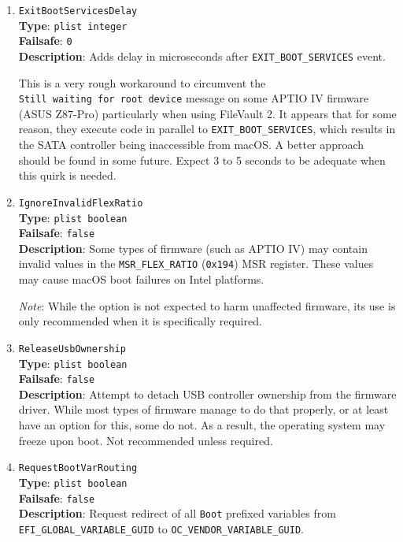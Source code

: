 \documentclass[]{article}
\begin{document}
\begin{enumerate}
\item
  \texttt{ExitBootServicesDelay}\\
  \textbf{Type}: \texttt{plist\ integer}\\
  \textbf{Failsafe}: \texttt{0}\\
  \textbf{Description}: Adds delay in microseconds after \texttt{EXIT\_BOOT\_SERVICES}
  event.

  This is a very rough workaround to circumvent the \texttt{Still\ waiting\ for\ root\ device} message
  on some APTIO IV firmware (ASUS Z87-Pro) particularly when using FileVault 2.
  It appears that for some reason, they execute code in parallel to \texttt{EXIT\_BOOT\_SERVICES},
  which results in the SATA controller being inaccessible from macOS. A better approach should be
  found in some future. Expect 3 to 5 seconds to be adequate when this quirk is needed.

\item
  \texttt{IgnoreInvalidFlexRatio}\\
  \textbf{Type}: \texttt{plist\ boolean}\\
  \textbf{Failsafe}: \texttt{false}\\
  \textbf{Description}: Some types of firmware (such as APTIO IV) may contain invalid values in the
  \texttt{MSR\_FLEX\_RATIO} (\texttt{0x194}) MSR register. These values may cause
  macOS boot failures on Intel platforms.

  \emph{Note}: While the option is not expected to harm unaffected firmware,
  its use is only recommended when it is specifically required.

\item
  \texttt{ReleaseUsbOwnership}\\
  \textbf{Type}: \texttt{plist\ boolean}\\
  \textbf{Failsafe}: \texttt{false}\\
  \textbf{Description}: Attempt to detach USB controller ownership from
  the firmware driver. While most types of firmware manage to do that properly,
  or at least have an option for this, some do not. As a result,
  the operating system may freeze upon boot. Not recommended unless required.

\item
  \texttt{RequestBootVarRouting}\\
  \textbf{Type}: \texttt{plist\ boolean}\\
  \textbf{Failsafe}: \texttt{false}\\
  \textbf{Description}: Request redirect of all \texttt{Boot} prefixed variables from
  \texttt{EFI\_GLOBAL\_VARIABLE\_GUID} to \newline \texttt{OC\_VENDOR\_VARIABLE\_GUID}.


\end{enumerate}
\end{document}
